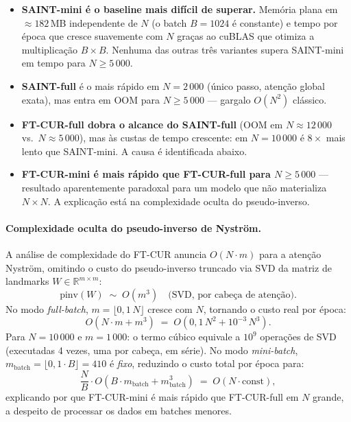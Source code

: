 \documentclass[12pt,a4paper]{article}
\begin{document}
\begin{itemize}

  \item \textbf{SAINT-mini é o baseline mais difícil de superar.} Memória
        plana em $\approx182$\,MB independente de $N$ (o batch $B{=}1024$ é
        constante) e tempo por época que cresce suavemente com $N$ graças ao
        cuBLAS que otimiza a multiplicação $B{\times}B$. Nenhuma das outras
        três variantes supera SAINT-mini em tempo para $N \geq 5\,000$.

  \item \textbf{SAINT-full} é o mais rápido em $N{=}2\,000$ (único passo,
        atenção global exata), mas entra em OOM para $N \geq 5\,000$
        — gargalo $O(N^2)$ clássico.

  \item \textbf{FT-CUR-full dobra o alcance do SAINT-full} (OOM em
        $N{\approx}12\,000$ vs.\ $N{\approx}5\,000$), mas às custas de tempo
        crescente: em $N{=}10\,000$ é $8{\times}$ mais lento que SAINT-mini.
        A causa é identificada abaixo.

  \item \textbf{FT-CUR-mini é mais rápido que FT-CUR-full para $N \geq
        5\,000$} — resultado aparentemente paradoxal para um modelo que não
        materializa $N{\times}N$. A explicação está na complexidade oculta do
        pseudo-inverso.

\end{itemize}

\paragraph{Complexidade oculta do pseudo-inverso de Nyström.}
A análise de complexidade do FT-CUR anuncia $O(N \cdot m)$ para a atenção
Nyström, omitindo o custo do pseudo-inverso truncado via SVD da matriz de
landmarks $W \in \mathbb{R}^{m \times m}$:
\[
  \text{pinv}(W) \;\sim\; O(m^3) \quad \text{(SVD, por cabeça de atenção)}.
\]
No modo \emph{full-batch}, $m = \lfloor 0{,}1\,N \rfloor$ cresce com $N$,
tornando o custo real por época:
\[
  O(N \cdot m + m^3) \;=\; O(0{,}1\,N^2 + 10^{-3}\,N^3).
\]
Para $N{=}10\,000$ e $m{=}1\,000$: o termo cúbico equivale a
$10^9$ operações de SVD (executadas 4 vezes, uma por cabeça, em série).
No modo \emph{mini-batch}, $m_{\text{batch}} = \lfloor 0{,}1 \cdot B \rfloor
= 410$ é \emph{fixo}, reduzindo o custo total por época para:
\[
  \frac{N}{B} \cdot O(B \cdot m_{\text{batch}} + m_{\text{batch}}^3)
  \;=\; O(N \cdot \text{const}),
\]
explicando por que FT-CUR-mini é mais rápido que FT-CUR-full em $N$ grande,
a despeito de processar os dados em batches menores.
\end{document}
